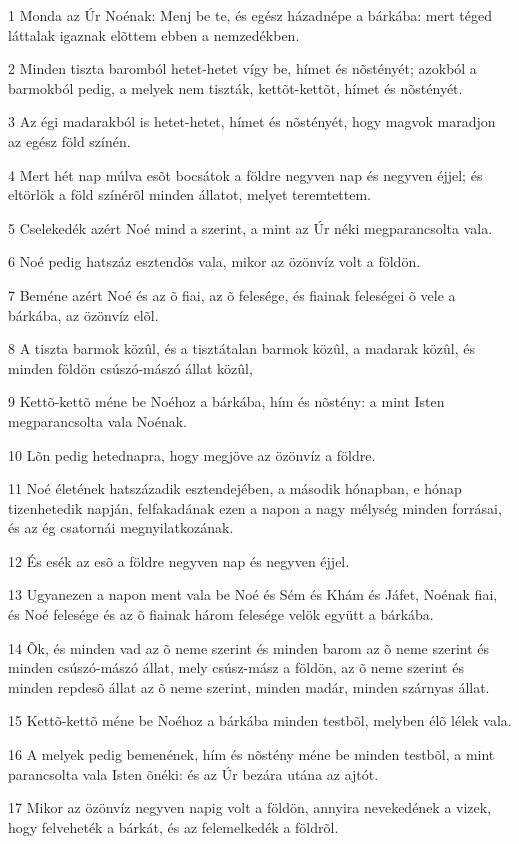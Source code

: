 \par 1 Monda az Úr Noénak: Menj be te, és egész házadnépe a bárkába: mert téged láttalak igaznak elõttem ebben a nemzedékben.
\par 2 Minden tiszta baromból hetet-hetet vígy be, hímet és nõstényét; azokból a barmokból pedig, a melyek nem tiszták, kettõt-kettõt, hímet és nõstényét.
\par 3 Az égi madarakból is hetet-hetet, hímet és nõstényét, hogy magvok maradjon az egész föld színén.
\par 4 Mert hét nap múlva esõt bocsátok a földre negyven nap és negyven éjjel; és eltörlök a föld színérõl minden állatot, melyet teremtettem.
\par 5 Cselekedék azért Noé mind a szerint, a mint az Úr néki megparancsolta vala.
\par 6 Noé pedig hatszáz esztendõs vala, mikor az özönvíz volt a földön.
\par 7 Beméne azért Noé és az õ fiai, az õ felesége, és fiainak feleségei õ vele a bárkába, az özönvíz elõl.
\par 8 A tiszta barmok közûl, és a tisztátalan barmok közûl, a madarak közûl, és minden földön csúszó-mászó állat közûl,
\par 9 Kettõ-kettõ méne be Noéhoz a bárkába, hím és nõstény: a mint Isten megparancsolta vala Noénak.
\par 10 Lõn pedig hetednapra, hogy megjöve az özönvíz a földre.
\par 11 Noé életének hatszázadik esztendejében, a második hónapban, e hónap tizenhetedik napján, felfakadának ezen a napon a nagy mélység minden forrásai, és az ég csatornái megnyilatkozának.
\par 12 És esék az esõ a földre negyven nap és negyven éjjel.
\par 13 Ugyanezen a napon ment vala be Noé és Sém és Khám és Jáfet, Noénak fiai, és Noé felesége és az õ fiainak három felesége velök együtt a bárkába.
\par 14 Õk, és minden vad az õ neme szerint és minden barom az õ neme szerint és minden csúszó-mászó állat, mely csúsz-mász a földön, az õ neme szerint és minden repdesõ állat az õ neme szerint, minden madár, minden szárnyas állat.
\par 15 Kettõ-kettõ méne be Noéhoz a bárkába minden testbõl, melyben élõ lélek vala.
\par 16 A melyek pedig bemenének, hím és nõstény méne be minden testbõl, a mint parancsolta vala Isten õnéki: és az Úr bezára utána az ajtót.
\par 17 Mikor az özönvíz negyven napig volt a földön, annyira nevekedének a vizek, hogy felveheték a bárkát, és az felemelkedék a földrõl.

